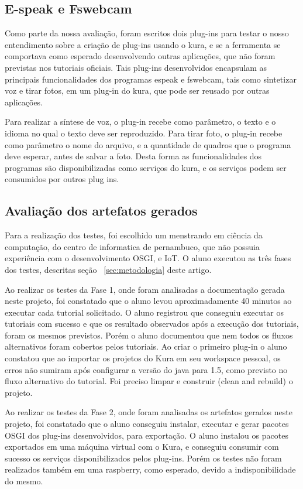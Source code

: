 \subsection{E-speak e Fswebcam}
Como parte da nossa avaliação, foram escritos dois plug-ins para testar o nosso entendimento sobre a criação de plug-ins usando o kura, e se a ferramenta se comportava como esperado desenvolvendo outras aplicações, que não foram previstas nos tutoriais oficiais. Tais plug-ins desenvolvidos encapsulam as principais funcionalidades dos programas espeak e fswebcam, tais como sintetizar voz e tirar fotos, em um plug-in do kura, que pode ser reusado por outras aplicações.

Para realizar a síntese de voz, o plug-in recebe como parâmetro, o texto e o idioma no qual o texto deve ser reproduzido.
Para tirar foto, o plug-in recebe como parâmetro o nome do arquivo, e a quantidade de quadros que o programa deve esperar, antes de salvar a foto. Desta forma as funcionalidades dos programas são disponibilizadas como serviços do kura, e os serviços podem ser consumidos por outros plug ins.

\subsection{Avaliação dos artefatos gerados}

Para a realização dos testes, foi escolhido um menstrando em ciência da computação, do centro de informatica de pernambuco, que não possuia experiência com o desenvolvimento OSGI, e IoT. O aluno executou as três fases dos testes, descritas seção ~\ref{sec:metodologia} deste artigo.

Ao realizar os testes da Fase 1, onde foram analisadas a documentação gerada neste projeto, foi constatado que o aluno levou aproximadamente 40 minutos ao executar cada tutorial solicitado. O aluno registrou que conseguiu executar os tutoriais com sucesso e que os resultado observados após a execução dos tutoriais, foram os mesmos previstos. Porém o aluno documentou que nem todos os fluxos alternativos foram cobertos pelos tutoriais. Ao criar o primeiro plug-in o aluno constatou que ao importar os projetos do Kura em seu workspace pessoal, os erros não sumiram após configurar a versão do java para 1.5, como previsto no fluxo alternativo do tutorial. Foi preciso limpar e construir (clean and rebuild) o projeto.

Ao realizar os testes da Fase 2, onde foram analisadas os artefatos gerados neste projeto, foi constatado que o aluno conseguiu instalar, executar e gerar pacotes OSGI dos plug-ins desenvolvidos, para exportação. O aluno instalou os pacotes exportados em uma máquina virtual com o Kura, e conseguiu consumir com sucesso os serviços disponibilizados pelos plug-ins. Porém os testes não foram realizados também em uma raspberry, como esperado, devido a indisponibilidade do mesmo.

